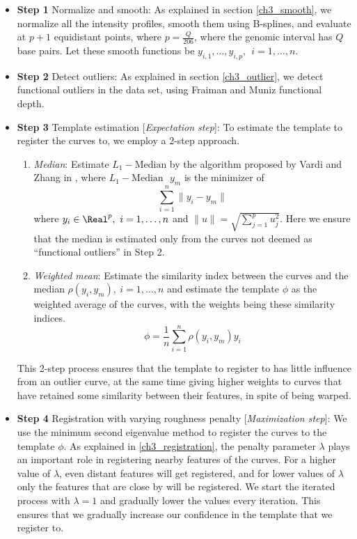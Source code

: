 \begin{itemize}
\item {\bf{Step 1}} Normalize and smooth: As explained in section \ref{ch3_smooth}, we normalize all the intensity profiles, smooth them using B-splines, and evaluate at $p + 1$ equidistant points, where $p = \frac{Q}{206}$, where the genomic interval has $Q$ base pairs. Let these smooth functions be $y_{i,1}, \dots, y_{i,p},\ \ i = 1,\dots,n$. 
\item {\bf{Step 2}} Detect outliers: As explained in section \ref{ch3_outlier}, we detect functional outliers in the data set, using Fraiman and Muniz functional depth. 
\item {\bf{Step 3}} Template estimation [{\emph{Expectation step}}]: To estimate the template to register the curves to, we employ a 2-step approach. 
\begin{enumerate}
\item {\emph{Median}}: Estimate $L_1-\text{Median}$ by the algorithm proposed by Vardi and Zhang in \cite{Vardi_Zhang_2000_PNAS}, where $L_1-\text{Median }$ $y_m$ is the minimizer of 
\[ \sum\limits_{i = 1}^n \|y_i - y_m \| \]
where $y_i \in \Real^p, \ i = 1,\dots,n$ and $\|u \| = \sqrt{\sum\limits_{j = 1}^p u_j^2}$. Here we ensure that the median is estimated only from the curves not deemed as ``functional outliers'' in Step 2. 
\item {\emph{Weighted mean}}: Estimate the similarity index between the curves and the median $\rho(y_i, y_m), \ i = 1,\dots,n$ and estimate the template $\phi$ as the weighted average of the curves, with the weights being these similarity indices. 
\[ \phi = \frac{1}{n}\sum\limits_{i = 1}^n \rho(y_i, y_m) y_i \]
\end{enumerate}
This 2-step process ensures that the template to register to has little influence from an outlier curve, at the same time giving higher weights to curves that have retained some similarity between their features, in spite of being warped. 
\item {\bf{Step 4}} Registration with varying roughness penalty [{\emph{Maximization step}}]: We use the minimum second eigenvalue method to register the curves to the template $\phi$. As explained in \ref{ch3_registration}, the penalty parameter $\lambda$ plays an important role in registering nearby features of the curves. For a higher value of $\lambda$, even distant features will get registered, and for lower values of $\lambda$ only the features that are close by will be registered. We start the iterated process with $\lambda = 1$ and gradually lower the values every iteration. This ensures that we gradually increase our confidence in the template that we register to. \\

\end{itemize}
